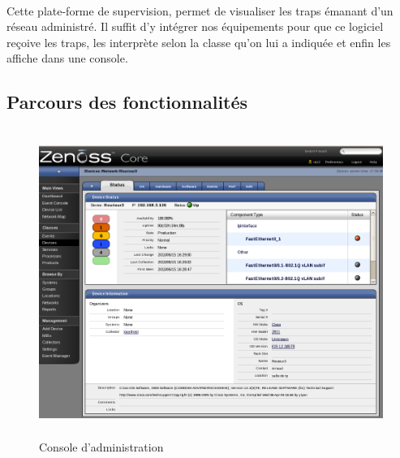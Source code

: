 \documentclass[12pt,a4paper,notitlepage]{article}
\begin{document}
\paragraph{}Cette plate-forme de supervision, permet de visualiser les traps émanant d'un réseau administré. Il suffit d'y intégrer nos équipements pour que ce logiciel reçoive les traps, les interprète selon la classe qu'on lui a indiquée et enfin les affiche dans une console.

\subsection{Parcours des fonctionnalités}


\begin{figure}[!h]
\begin{center}
\includegraphics[height=10cm]{zenoss_interface}
\caption{Console d'administration}
\label{fig:console}
\end{center}
\end{figure}
\end{document}

